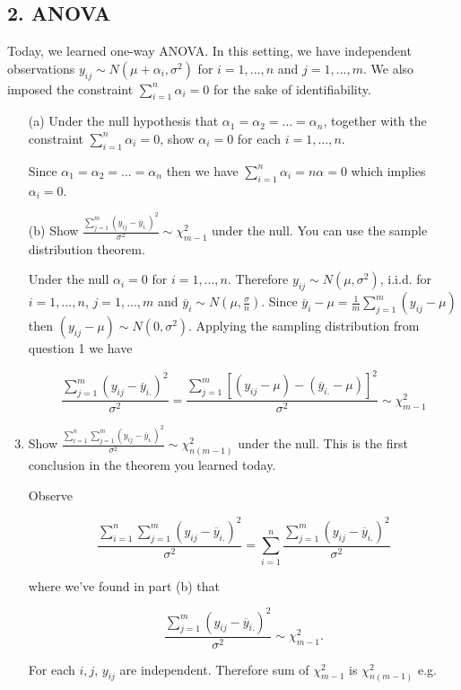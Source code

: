 \documentclass{tufte-book}
\begin{document}
\subsection{2. ANOVA}
Today, we learned one-way ANOVA.  In this setting, we have independent observations $y_{ij} \sim N(\mu + \alpha_i, \sigma^2)$ for $i=1,...,n$ and $j=1,...,m$.  We also imposed the constraint $\sum_{i=1}^n\alpha_i = 0$ for the sake of identifiability.

\begin{enumerate}

\item[(a)] Under the null hypothesis that $\alpha_1 = \alpha_2= ...=\alpha_n$, together with the constraint $\sum_{i=1}^n\alpha_i = 0$, show $\alpha_i = 0$ for each $i=1,...,n$.

Since $\alpha_1=\alpha_2=...=\alpha_n$ then we have $\sum_{i=1}^n\alpha_i =n\alpha = 0$ which implies $\alpha_i=0$.

\item[(b)]  Show $\frac{\sum_{j=1}^m(y_{ij} - \overline{y}_{i.})^2}{\sigma^2} \sim \chi_{m-1}^2$ under the null.  You can use the sample distribution theorem.

Under the null $\alpha_i = 0$ for $i=1,...,n$. Therefore $y_{ij} \sim N(\mu, \sigma^2)$, i.i.d.  for $i=1,...,n$, $j=1,...,m$ and $\overline{y}_i \sim N(\mu, \frac{\sigma}{n})$.  Since $\overline{y}_i - \mu = \frac{1}{m}\sum_{j=1}^m(y_{ij}-\mu)$ then $(y_{ij} - \mu) \sim N(0, \sigma^2)$.  Applying the sampling distribution from question 1 we have

\[ \frac{\sum_{j=1}^m (y_{ij} - \overline{y}_{i.})^2}{\sigma^2} = \frac{\sum_{j=1}^m [(y_{ij} - \mu) -(\overline{y}_{i.}-\mu)]^2}{\sigma^2} \sim \chi_{m-1}^2 \]


\item Show $\frac{\sum_{i=1}^n \sum_{j=1}^m(y_{ij} - \overline{y}_{i.})^2}{\sigma^2} \sim \chi_{n(m-1)}^2$ under the null.  This is the first conclusion in the theorem you learned today.

Observe

\[ \frac{\sum_{i=1}^n \sum_{j=1}^m(y_{ij} - \overline{y}_{i.})^2}{\sigma^2} = \sum_{i=1}^n \frac{\sum_{j=1}^m(y_{ij} - \overline{y}_{i.})^2}{\sigma^2} \]

where we've found in part (b) that

\[ \frac{\sum_{j=1}^m(y_{ij} - \overline{y}_{i.})^2}{\sigma^2} \sim \chi_{m-1}^2 .\]

For each $i,j$, $y_{ij}$ are independent.  Therefore sum of $\chi_{m-1}^2$ is $\chi_{n(m-1)}^2$ e.g.


\end{enumerate}
\end{document}
